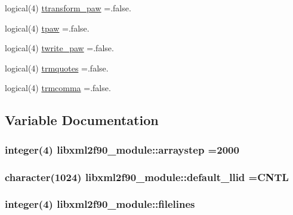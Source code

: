 \begin{DoxyCompactItemize}
\item 
logical(4) \hyperlink{namespacelibxml2f90__module_a57a7bbf9cf74f527371bfb5496135bdf}{ttransform\+\_\+paw} =.false.
\item 
logical(4) \hyperlink{namespacelibxml2f90__module_aaa46bc31e8406d83b035ff8b620563a8}{tpaw} =.false.
\item 
logical(4) \hyperlink{namespacelibxml2f90__module_aaba636a60c116ce3dfa158403414d3b1}{twrite\+\_\+paw} =.false.
\item 
logical(4) \hyperlink{namespacelibxml2f90__module_aa7358595240bdca537fc1e126fb8f6a8}{trmquotes} =.false.
\item 
logical(4) \hyperlink{namespacelibxml2f90__module_a01eddf97a14bcc393835cd086f78dfdf}{trmcomma} =.false.
\end{DoxyCompactItemize}


\subsection{Variable Documentation}
\subsubsection[{\texorpdfstring{arraystep}{arraystep}}]{\setlength{\rightskip}{0pt plus 5cm}integer(4) libxml2f90\+\_\+module\+::arraystep =2000}\hypertarget{namespacelibxml2f90__module_a03a53e403791ec1e112a71f5f2831522}{}\label{namespacelibxml2f90__module_a03a53e403791ec1e112a71f5f2831522}
\subsubsection[{\texorpdfstring{default\+\_\+llid}{default_llid}}]{\setlength{\rightskip}{0pt plus 5cm}character(1024) libxml2f90\+\_\+module\+::default\+\_\+llid =\textquotesingle{}C\+N\+TL\textquotesingle{}}\hypertarget{namespacelibxml2f90__module_a2dc8e61fe0a8b9c60b5197984e7b30ae}{}\label{namespacelibxml2f90__module_a2dc8e61fe0a8b9c60b5197984e7b30ae}
\subsubsection[{\texorpdfstring{filelines}{filelines}}]{\setlength{\rightskip}{0pt plus 5cm}integer(4) libxml2f90\+\_\+module\+::filelines}\hypertarget{namespacelibxml2f90__module_a63c8792c8a009d1875c66340984b0879}{}\label{namespacelibxml2f90__module_a63c8792c8a009d1875c66340984b0879}
